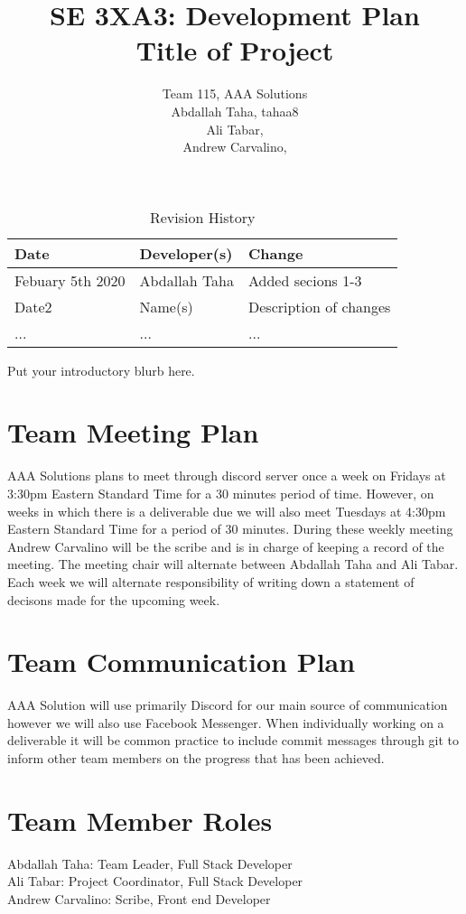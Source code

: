 \documentclass{article}
\title{SE 3XA3: Development Plan\\Title of Project}
\author{Team 115, AAA Solutions
		\\ Abdallah Taha, tahaa8
		\\ Ali Tabar, 
		\\ Andrew Carvalino,
}
\date{}
\begin{document}
\begin{table}[hp]
\caption{Revision History} \label{TblRevisionHistory}
\begin{tabularx}{\textwidth}{llX}
\toprule
\textbf{Date} & \textbf{Developer(s)} & \textbf{Change} \\
\midrule
Febuary 5th 2020 & Abdallah Taha & Added secions 1-3 \\
Date2 & Name(s) & Description of changes\\
... & ... & ...\\
\bottomrule
\end{tabularx}
\end{table}

\newpage

\maketitle

Put your introductory blurb here.

\section{Team Meeting Plan}
AAA Solutions plans to meet through discord server once a week on Fridays at 3:30pm Eastern Standard Time for a 30 minutes period of time. However, on weeks in which there is a deliverable due we will also meet Tuesdays at 4:30pm Eastern Standard Time for a period of 30 minutes. During these weekly meeting Andrew Carvalino will be the scribe and is in charge of keeping a record of the meeting. The meeting chair will alternate between Abdallah Taha and Ali Tabar. Each week we will alternate responsibility of writing down a statement of decisons made for the upcoming week. 

\section{Team Communication Plan}
AAA Solution will use primarily Discord for our main source of communication however we will also use Facebook Messenger. When individually working on a deliverable it will be common practice to include commit messages through git to inform other team members on the progress that has been achieved. 

\section{Team Member Roles}
Abdallah Taha: Team Leader, Full Stack Developer \\
Ali Tabar: Project Coordinator, Full Stack Developer \\
Andrew Carvalino: Scribe, Front end Developer \\
\end{document}
